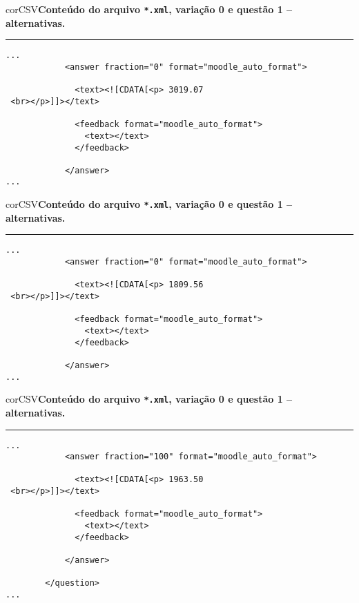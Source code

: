 \begin{myboxCode}{corCSV}{\textbf{Conteúdo do arquivo \texttt{*.xml}, variação 0 e questão 1 -- alternativas.}}\vspace{3mm}
\hrule
{\scriptsize
\begin{verbatim}
...
            <answer fraction="0" format="moodle_auto_format">
            
              <text><![CDATA[<p> 3019.07
 <br></p>]]></text>
 
              <feedback format="moodle_auto_format">
                <text></text>
              </feedback>
              
            </answer>
...
\end{verbatim}
}
\end{myboxCode}

\begin{myboxCode}{corCSV}{\textbf{Conteúdo do arquivo \texttt{*.xml}, variação 0 e questão 1 -- alternativas.}}\vspace{3mm}
\hrule
{\scriptsize
\begin{verbatim}
...
            <answer fraction="0" format="moodle_auto_format">
            
              <text><![CDATA[<p> 1809.56
 <br></p>]]></text>
 
              <feedback format="moodle_auto_format">
                <text></text>
              </feedback>
              
            </answer>
...
\end{verbatim}
}
\end{myboxCode}

\begin{myboxCode}{corCSV}{\textbf{Conteúdo do arquivo \texttt{*.xml}, variação 0 e questão 1 -- alternativas.}}\vspace{3mm}
\hrule
{\scriptsize
\begin{verbatim}
...
            <answer fraction="100" format="moodle_auto_format">
            
              <text><![CDATA[<p> 1963.50
 <br></p>]]></text>
 
              <feedback format="moodle_auto_format">
                <text></text>
              </feedback>
              
            </answer>
        
        </question>     
...
\end{verbatim}
}
\end{myboxCode}

